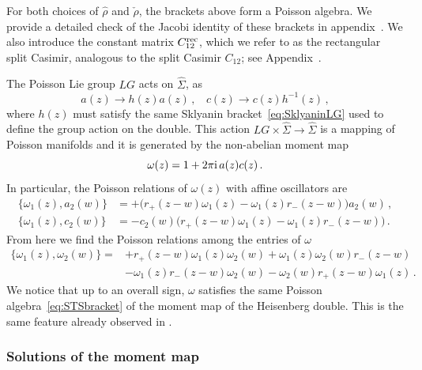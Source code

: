 For both choices of $\hat{\rho}$ and $\check{\rho}$, the brackets above form a Poisson algebra. We provide a detailed check of the Jacobi identity of these brackets in appendix~.
We also introduce the constant matrix $C_{12}^{\textup{rec}}$, which we refer to as the rectangular split Casimir, analogous to the split Casimir $C_{12}$;
see Appendix~\todo{[TODO: missing appendix \texttt{app:matrix\_bblocks} of the paper; include the overall factor $\varkappa=2\pi\I$]}. 

The Poisson Lie group $LG$ acts on $\widehat{\Sigma}$,  as 
\begin{equation}
a(z)\to h(z)a(z)\, , ~~~~c(z)\to c(z)h^{-1}(z) \,,
\end{equation}
where $h(z)$ must satisfy the same Sklyanin bracket~\eqref{eq:SklyaninLG} used to define the group action on the double.
This action $LG\times \widehat{\Sigma}\to \widehat{\Sigma}$ is a mapping of Poisson manifolds and it is generated by the non-abelian moment map
\begin{equation}
\label{eq:oscil_mom_map}
\omega(z)=1 + 2\pi\mathrm{i}\, a(z)c(z)\, .
\end{equation}
In particular, the Poisson relations of $\omega(z)$ with affine oscillators are 
\begin{equation}
\begin{aligned}
\{\omega_1(z),a_2(w)\}&=+\big(r_+(z-w)\omega_1(z)-\omega_1(z)r_-(z-w)\big)a_2(w)\, ,\\
\{\omega_1(z),c_2(w)\}&=- c_2(w)\big(r_+(z-w)\omega_1(z)-\omega_1(z)r_-(z-w)\big)\, .
\end{aligned}
\end{equation}
From here we find the Poisson relations among the entries of $\omega$
\begin{equation}
\label{eq:Pois_br_mom_map}
\begin{aligned}
\{\omega_1(z),\omega_2(w)\}=&+r_+(z-w)\omega_1(z)\omega_2(w)+\omega_1(z)\omega_2(w)r_-(z-w)\\
&-\omega_1(z)r_-(z-w)\omega_2(w)-\omega_2(w)r_+(z-w)\omega_1(z)\, .
\end{aligned}
\end{equation}
We notice that up to an overall sign, $\omega$ satisfies the same Poisson algebra~\eqref{eq:STSbracket} of the moment map of the Heisenberg double. This is the same feature already observed in \cite{arutyunov_hyperbolic_2019}. 

\subsubsection{Solutions of the moment map}

